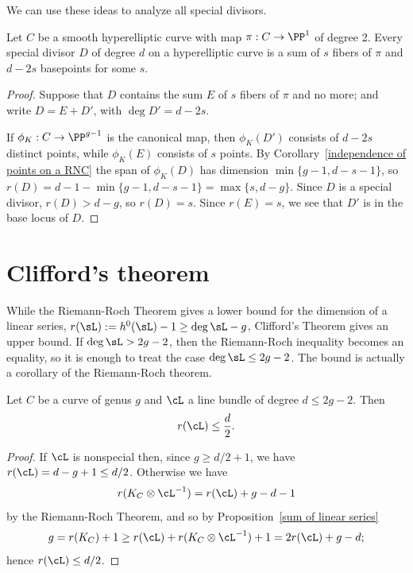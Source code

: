 We can use these ideas to analyze all special divisors.

\begin{corollary}\label{special on hyperelliptic} Let $C$ be a smooth hyperelliptic curve with map $\pi: C\to \PP^1$ of degree 2.
Every special divisor $D$ of degree $d$ on a hyperelliptic curve is a sum of $s$ fibers of $\pi$ and $d-2s$ basepoints for some $s$.
\end{corollary}

\begin{proof}
Suppose that $D$ contains the sum $E$ of $s$ fibers of $\pi$ and no more; and write $D = E+D'$, with $\deg D' = d-2s$.
 
If $\phi_K:C \to \PP^{g-1}$ is the canonical map, then $\phi_K(D')$ consists of $d-2s$ distinct points, while $\phi_K(E)$ consists of
$s$ points. By Corollary~\ref{independence of points on a RNC} the span of $\phi_K(D)$ has dimension $\min\{g-1, d-s-1\}$, so 
$r(D) = d-1-\min\{g-1, d-s-1\} = \max \{s,d-g\}$. Since $D$ is a special divisor, $r(D) > d-g$, so $r(D) = s$. 
Since $r(E) =s$, we see that $D'$ is in the base locus of $D$.
\end{proof}

\section{Clifford's theorem}

While the Riemann-Roch Theorem gives a lower bound for the dimension of a linear series, $r(\sL) := h^0(\sL)-1 \geq \deg \sL -g$, Clifford's Theorem
gives an upper bound. If $\deg \sL>2g-2$, then the Riemann-Roch inequality becomes an equality, so it is enough to treat the case $\deg \sL \leq 2g-2$. The bound is actually a corollary of the Riemann-Roch theorem.

\begin{corollary}\label{Clifford bound}
 Let $C$ be a curve of genus $g$ and $\cL$ a line bundle of degree $d \leq 2g-2$. Then
$$
r(\cL) \leq \frac{d}{2}.
$$
\end{corollary}

\begin{proof}
If $\cL$ is nonspecial then, since $g\geq d/2 + 1$, we have $r(\cL) = d-g+1\leq d/2$.
Otherwise we have
$$
r(K_C\otimes \cL^{-1}) = r(\cL) +g - d - 1
$$
by the Riemann-Roch Theorem,
and so by Proposition~\ref{sum of linear series}
$$
g = r(K_C)+1  \geq r(\cL) + r(K_C\otimes \cL^{-1}) +1  = 2r(\cL) +g - d;
$$
hence $r(\cL) \leq d/2$.
\end{proof}

